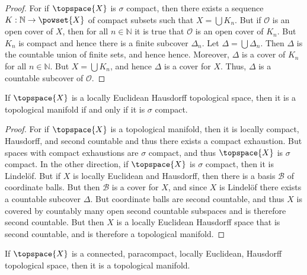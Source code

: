             \begin{proof}
                For if $\topspace{X}$ is $\sigma$ compact, then there exists a
                sequence $K:\mathbb{N}\rightarrow\powset{X}$ of compact subsets
                such that $X=\bigcup{K}_{n}$. But if $\mathcal{O}$ is an open
                cover of $X$, then for all $n\in\mathbb{N}$ it is true that
                $\mathcal{O}$ is an open cover of $K_{n}$. But $K_{n}$ is
                compact and hence there is a finite subcover $\Delta_{n}$. Let
                $\Delta=\bigcup\Delta_{n}$. Then $\Delta$ is the countable
                union of finite sets, and hence hence. Moreover, $\Delta$ is
                a cover of $K_{n}$ for all $n\in\mathbb{N}$. But
                $X=\bigcup{K}_{n}$, and hence $\Delta$ is a cover for $X$. Thus,
                $\Delta$ is a countable subcover of $\mathcal{O}$.
            \end{proof}
            \begin{theorem}
                If $\topspace{X}$ is a locally Euclidean Hausdorff topological
                space, then it is a topological manifold if and only if it is
                $\sigma$ compact.
            \end{theorem}
            \begin{proof}
                For if $\topspace{X}$ is a topological manifold, then it is
                locally compact, Hausdorff, and second countable and thus there
                exists a compact exhaustion. But spaces with compact exhaustions
                are $\sigma$ compact, and thus $\topspace{X}$ is $\sigma$
                compact. In the other direction, if $\topspace{X}$ is $\sigma$
                compact, then it is Lindel\"{o}f. But if $X$ is locally
                Euclidean and Hausdorff, then there is a basis $\mathcal{B}$
                of coordinate balls. But then $\mathcal{B}$ is a cover for $X$,
                and since $X$ is Lindel\"{o}f there exists a countable
                subcover $\Delta$. But coordinate balls are second countable,
                and thus $X$ is covered by countably many open second countable
                subspaces and is therefore second countable. But then $X$ is a
                locally Euclidean Hausdorff space that is second countable, and
                is therefore a topological manifold.
            \end{proof}
            \begin{theorem}
                If $\topspace{X}$ is a connected, paracompact, locally
                Euclidean, Hausdorff topological space, then it is a
                topological manifold.
            \end{theorem}
